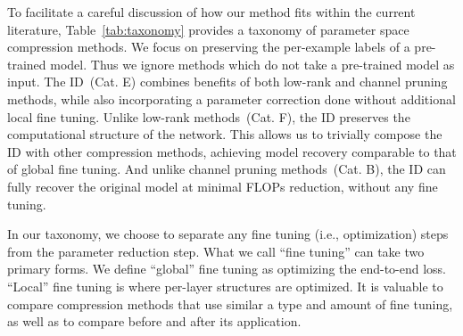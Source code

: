 To facilitate a careful discussion of how our method fits within the current literature, Table~\ref{tab:taxonomy} provides a taxonomy of parameter space compression methods.
We focus on preserving the per-example labels of a pre-trained model. 
Thus we ignore methods which do not take a pre-trained model as input.
The ID~(Cat. E) combines benefits of both low-rank and channel pruning methods, while also incorporating a parameter correction done without additional local fine tuning.
Unlike low-rank methods~(Cat. F), the ID preserves the computational structure of the network.
This allows us to trivially compose the ID with other compression methods, achieving model recovery comparable to that of global fine tuning.
And unlike channel pruning methods~(Cat. B), the ID can fully recover the original model at minimal FLOPs reduction, without any fine tuning. 





In our taxonomy, we choose to separate any fine tuning (i.e., optimization) steps from the parameter reduction step.
What we call ``fine tuning'' can take two primary forms.
We define ``global'' fine tuning as optimizing the end-to-end loss.
``Local'' fine tuning is where per-layer structures are optimized.
It is valuable to compare compression methods that use similar a type and amount of fine tuning, as well as to compare before and after its application.
